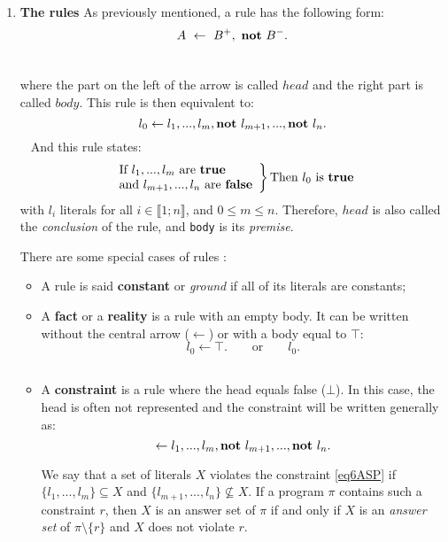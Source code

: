 \begin{enumerate}
\item \textbf{The rules}
As previously mentioned, a rule has the following form:
\texttt{
\begin{equation*} \label{eq3ASP}
 A ~ \leftarrow ~ B^+, ~ \textbf{not}~ B^-.
\end{equation*}
}

where the part on the left of the arrow is called $ head$
and the right part is called $body$.
This rule is then equivalent to:
\texttt{
\begin{equation*} \label{eq2ASP}
l_{0} \leftarrow l_{1},...,l_{m}, \textbf{not}~ l_{m+1},..., \textbf{not}~ l_{n}.
\end{equation*}
}
And this rule states:
\[
\left.
    \begin{array}{ll}
        \text{If} ~ \texttt{$l_{1},...,l_{m}$}  ~ \text{are \textbf{true}}\\
        \text{and} ~ \texttt{$l_{m+1},...,l_{n}$} ~ \text{are \textbf{false}}
    \end{array}
\right \} \text{Then} ~ \texttt{$ l_{0} $} ~ \text{is } \textbf{true} 
\]
with \texttt{$l_{i}$} literals for all $i \in \llbracket 1 ; n \rrbracket$, and $0 \leq m \leq n$.
Therefore, $head$ is also called the \emph{conclusion} of the rule,
and \texttt{body} is its \emph{premise}.

There are some special cases of rules \cite{Vladimir,baral2003knowledge}:
\begin{itemize}
\item A rule is said \textbf{constant} or \emph{ground} if all of its literals are constants;
\item A \textbf{fact} or a \textbf{reality} is a rule with an empty body.
  It can be written without the central arrow ($\leftarrow$) or with a body equal to $\top$:
  \texttt{
\begin{equation} 
l_{0} \leftarrow \top. \qquad \text{or} \qquad l_{0}.
 \label{eq5ASP}
\end{equation}
}

\item A \textbf{constraint} is a rule where the head equals false ($\bot$).
  In this case, the head is often not represented and the constraint will be written generally as:
\begin{equation} 
  \leftarrow l_{1},...,l_{m}, \textbf{not}~ l_{m+1},..., \textbf{not}~ l_{n}.
  \label{eq6ASP}
\end{equation}

We say that a set of literals $X$ violates the constraint \eqref{eq6ASP} if $\{l_{1},...,l_{m}\} \subseteq X$ and $\{l_{m+1},...,l_{n}\} \nsubseteq X$.
If a program $\pi$ contains such a constraint $r$, then $X$ is an answer set of $\pi$ if and only if $X$ is an \textit{answer set} of $\pi \setminus \{r\}$ and $X$ does not violate $r$.


\end{itemize}
\end{enumerate}

